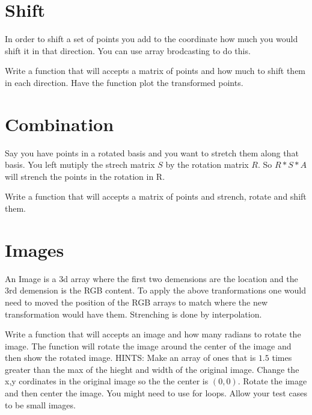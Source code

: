 \section*{Shift}
In order to shift a set of points you add to the coordinate how much you would shift it in that direction. You can use array brodcasting to do this.

\begin{problem}
Write a function that will accepts a matrix of points and how much to shift them in each direction. Have the function plot the transformed points.
\end{problem}

\section*{Combination}
Say you have points in a rotated basis and you want to stretch them along that basis. You left mutiply the strech matrix $S$ by the rotation matrix $R$. So $R*S*A$ will strench the points in the rotation in R. 

\begin{problem}
Write a function that will accepts a matrix of points and strench, rotate and shift them.
\end{problem}


\section*{Images}

An Image is a 3d array where the first two demensions are the location and the 3rd demension is the RGB content. To apply the above tranformations one would need to moved the position of the RGB arrays to match where the new transformation would have them. Strenching is done by
 interpolation.
\begin{problem}
Write a function that will accepts an image and how many radians to rotate the image. The function will rotate the image around the center of the image and then show the rotated image. HINTS: Make an array of ones that is $1.5$ times greater than the max of the hieght and width of the original image. Change the x,y cordinates in the original image so the the center is $(0,0)$. Rotate the image and then center the image. You might need to use for loops. Allow your test cases to be small images.
\end{problem}


